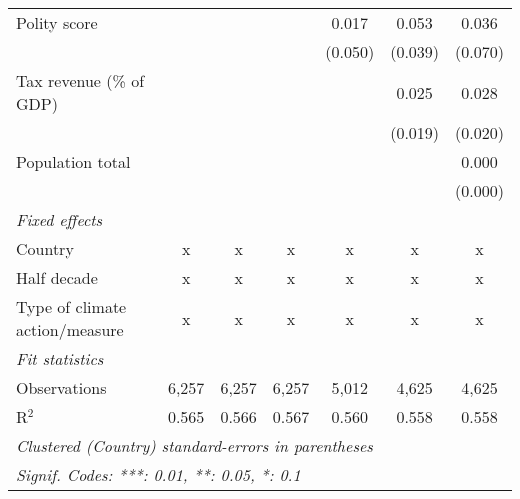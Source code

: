 \begin{tabular}{lcccccc}
   Polity score                                                     &         &              &                & 0.017          & 0.053          & 0.036\\   
                                                                    &         &              &                & (0.050)        & (0.039)        & (0.070)\\   
   Tax revenue (\% of GDP)                                          &         &              &                &                & 0.025          & 0.028\\   
                                                                    &         &              &                &                & (0.019)        & (0.020)\\   
   Population total                                                 &         &              &                &                &                & 0.000\\   
                                                                    &         &              &                &                &                & (0.000)\\   
   \emph{Fixed effects}\\
   Country                                                          & x       & x            & x              & x              & x              & x\\  
   Half decade                                                      & x       & x            & x              & x              & x              & x\\  
   Type of climate action/measure                                   & x       & x            & x              & x              & x              & x\\  
   \midrule \emph{Fit statistics}\\
   Observations                                                     & 6,257   & 6,257        & 6,257          & 5,012          & 4,625          & 4,625\\  
   R$^2$                                                            & 0.565   & 0.566        & 0.567          & 0.560          & 0.558          & 0.558\\  
   \midrule
   \multicolumn{7}{l}{\emph{Clustered (Country) standard-errors in parentheses}}\\
   \multicolumn{7}{l}{\emph{Signif. Codes: ***: 0.01, **: 0.05, *: 0.1}}\\
\end{tabular}
\par\endgroup


